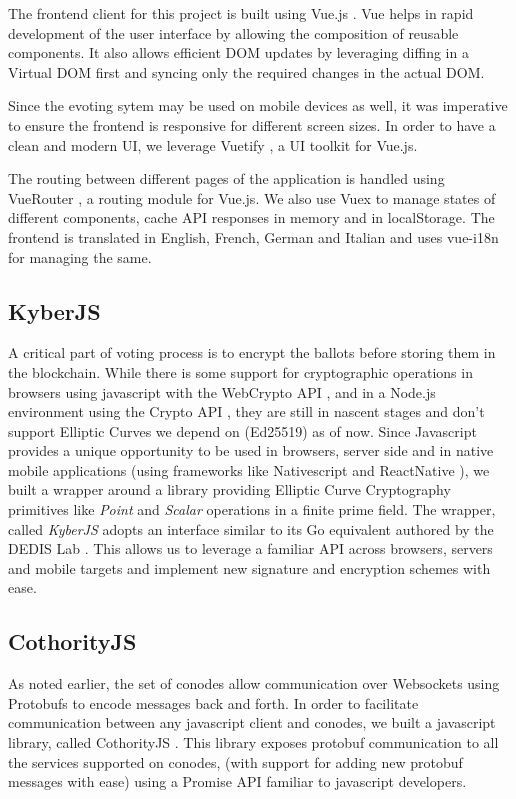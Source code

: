 The frontend client for this project is built using Vue.js \cite{vuejs}. Vue helps in rapid development of the user interface by allowing the composition of reusable components. It also allows efficient DOM updates by leveraging diffing in a Virtual DOM first and syncing only the required changes in the actual DOM.

Since the evoting sytem may be used on mobile devices as well, it was imperative to ensure the frontend is responsive for different screen sizes. In order to have a clean and modern UI, we leverage Vuetify \cite{vuetify}, a UI toolkit for Vue.js.

The routing between different pages of the application is handled using VueRouter \cite{vuerouter}, a routing module for Vue.js. We also use Vuex \cite{vuex} to manage states of different components, cache API responses in memory and in localStorage. The frontend is translated in English, French, German and Italian and uses vue-i18n \cite{vuei18n} for managing the same.

\subsection{KyberJS}
A critical part of voting process is to encrypt the ballots before storing them in the blockchain. While there is some support for cryptographic operations in browsers using javascript with the WebCrypto API \cite{webcrypto}, and in a Node.js environment using the Crypto API \cite{nodecrypto}, they are still in nascent stages and don't support Elliptic Curves we depend on (Ed25519) as of now. Since Javascript provides a unique opportunity to be used in browsers, server side and in native mobile applications (using frameworks like Nativescript \cite{nativescript} and ReactNative \cite{reactnative}), we built a wrapper around a library \cite{elliptic} providing Elliptic Curve Cryptography primitives like \emph{Point} and \emph{Scalar} operations in a finite prime field. The wrapper, called \textit{KyberJS} \cite{kyberjs} adopts an interface similar to its Go equivalent authored by the DEDIS Lab \cite{kyber}. This allows us to leverage a familiar API across browsers, servers and mobile targets and implement new signature and encryption schemes with ease.

\subsection{CothorityJS}
As noted earlier, the set of conodes allow communication over Websockets using Protobufs to encode messages back and forth. In order to facilitate communication between any javascript client and conodes, we built a javascript library, called CothorityJS \cite{cothorityjs}. This library exposes protobuf communication to all the services supported on conodes, (with support for adding new protobuf messages with ease) using a Promise API familiar to javascript developers.